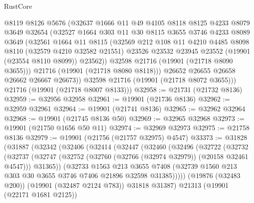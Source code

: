 \begin{lexlean}{RustCore}
\begin{coremodule}
            @8119
            @8126
            @5676
            (@32637
              @1666
              @11
              @49
              @4105
              @8118
              @8125
              @4233
              @8079
              @3649
              @32654
              (@32527
                @1664
                @303
                @11
                @30
                @8115
                @3655
                @3746
                @4233
                @8089
                @3649
                (@32561
                  @1664
                  @11
                  @8115
                  (@32569
                    @212
                    @108
                    @11
                    @4210
                    @4485
                    @8098
                    @8110
                    (@32579 @4210 @32582 @21551)
                    @23526
                    @23532
                    @23945
                    @23552
                    (@19901 (@23554 @8110 @8099))
                    @23562))
                @32598
                @21716
                (@19901 (@21718 @8090 @3655)))
              @21716
              (@19901 (@21718 @8080 @8118)))
            @26652
            @26655
            @26658
            @26662
            @26667
            @26673))
        @32598
        @21716
        (@19901 (@21718 @8072 @3655)))
      @21716
      (@19901 (@21718 @8007 @8133)))
@32958 := @21731 (@21732 @8136)
@32959 := @32956 @32958
@32961 := @19901 (@21736 @8136)
@32962 := @32959 @32961
@32964 := @19901 (@21741 @8136)
@32965 := @32962 @32964
@32968 := @19901 (@21745 @8136 @50)
@32969 := @32965 @32968
@32973 := @19901 (@21750 @1656 @50 @11)
@32974 := @32969 @32973
@32975 := @21758 @8136
@32979 := @19901 (@21756 (@21757 @32975) @4547)
@33373 := @31828
    (@31887
      (@32342
        (@32406
          (@32414
            (@32447
              (@32460
                (@32496
                  (@32722
                    (@32732
                      (@32737
                        (@32747
                          (@32752 (@32760 (@32766 (@32974 @32979)) (@20158 @32461 @4547)))
                          @31365))
                      (@32733
                        @1563
                        @213
                        @3655
                        @7408
                        (@32739 @1560 @213 @303 @30 @3655 @3746 @7406 @21896 @32598 @31385)))))
                (@19876 (@32483 @200))
                (@19901 (@32487 @2124 @783))
                @31818
                @31387)
              @21313
              (@19901 (@22171 @1681 @2125))

\end{coremodule}
\end{lexlean}
